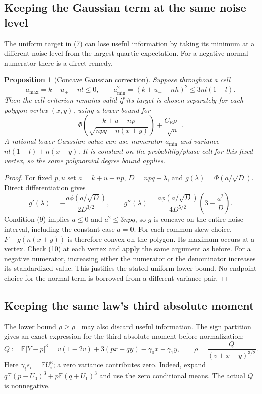 \documentclass[11pt,a4paper]{article}
\newcommand{\E}{\mathbb E}
\newcommand{\CE}{C_{\mathrm E}}
\newtheorem{proposition}{Proposition}
\begin{document}
\subsection{Keeping the Gaussian term at the same noise level}
The uniform target in (7) can lose useful information by taking its
minimum at a different noise level from the largest quartic expectation.
For a negative normal numerator there is a direct remedy.

\begin{proposition}[Concave Gaussian correction]
Suppose throughout a cell
\[
 a_{\max}=k+u_+-nl\le0,\qquad
 a_{\min}^2=(k+u_--nh)^2\le3nl(1-l).
 \tag{9}
\]
Then the cell criterion remains valid if its target is chosen separately
for each polygon vertex $(x,y)$, using a lower bound for
\[
 \Phi\left(\frac{k+u-np}{\sqrt{npq+n(x+y)}}\right)
                         +\frac{\CE\rho_-}{\sqrt n}.
 \tag{10}
\]
A rational lower Gaussian value can use numerator $a_{\min}$ and
variance $nl(1-l)+n(x+y)$. It is constant on the probability/phase cell
for this fixed vertex, so the same polynomial degree bound applies.
\end{proposition}
\begin{proof}
For fixed $p,u$ set $a=k+u-np$, $D=npq+\lambda$, and
$g(\lambda)=\Phi(a/\sqrt D)$. Direct differentiation gives
\[
 g'(\lambda)=-\frac{a\phi(a/\sqrt D)}{2D^{3/2}},\qquad
 g''(\lambda)=\frac{a\phi(a/\sqrt D)}{4D^{5/2}}
                         \left(3-\frac{a^2}{D}\right).
\]
Condition (9) implies $a\le0$ and $a^2\le3npq$, so $g$ is concave
on the entire noise interval, including the constant case $a=0$.
For each common skew choice, $F-g(n(x+y))$ is therefore convex
on the polygon. Its maximum occurs at a vertex. Check (10) at
each vertex and apply the same argument as before. For a negative
numerator, increasing either the numerator or the denominator
increases its standardized value. This justifies the stated
uniform lower bound. No endpoint choice for the normal term is
borrowed from a different variance pair.
\end{proof}

\subsection{Keeping the same law's third absolute moment}
The lower bound $\rho\ge\rho_-$ may also discard useful information.
The sign partition gives an exact expression for the third absolute
moment before normalization:
\[
 Q:=\E|Y-p|^3
   =v(1-2v)+3(px+qy)-\gamma_0x+\gamma_1y,
 \qquad \rho=\frac{Q}{(v+x+y)^{3/2}}.
 \tag{11}
\]
Here $\gamma_i s_i=\E U_i^3$; a zero variance contributes zero.
Indeed, expand $q\E(p-U_0)^3+p\E(q+U_1)^3$ and use the
zero conditional means. The actual $Q$ is nonnegative.
\end{document}
